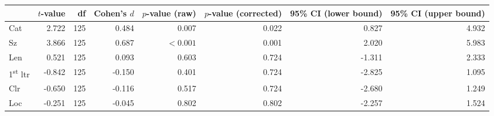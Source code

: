 \begin{tabular}{lrrrrrrr}
\toprule
 & $t$-value & df & Cohen's $d$ & $p$-value (raw) & $p$-value (corrected) & 95\% CI (lower bound) & 95\% CI (upper bound) \\
\midrule
\rowcolor[HTML]{fffee3} Cat & 2.722 & 125 & 0.484 & 0.007 & 0.022 & 0.827 & 4.932 \\
\rowcolor[HTML]{fffee3} Sz & 3.866 & 125 & 0.687 & $< 0.001$ & 0.001 & 2.020 & 5.983 \\
 Len & 0.521 & 125 & 0.093 & 0.603 & 0.724 & -1.311 & 2.333 \\
 1\textsuperscript{st} ltr & -0.842 & 125 & -0.150 & 0.401 & 0.724 & -2.825 & 1.095 \\
 Clr & -0.650 & 125 & -0.116 & 0.517 & 0.724 & -2.680 & 1.249 \\
 Loc & -0.251 & 125 & -0.045 & 0.802 & 0.802 & -2.257 & 1.524 \\
\bottomrule
\end{tabular}